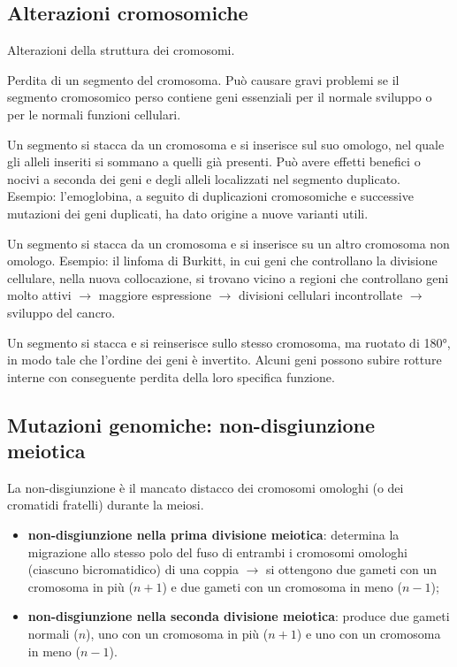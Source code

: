 \subsection{Alterazioni cromosomiche}

Alterazioni della struttura dei cromosomi.

Perdita di un segmento del cromosoma. Può causare gravi problemi se il segmento cromosomico perso contiene geni essenziali per il normale sviluppo o per le normali funzioni cellulari.

Un segmento si stacca da un cromosoma e si inserisce sul suo omologo, nel quale gli alleli inseriti si sommano a quelli già presenti. Può avere effetti benefici o nocivi a seconda dei geni e degli alleli localizzati nel segmento duplicato. Esempio: l'emoglobina, a seguito di duplicazioni cromosomiche e successive mutazioni dei geni duplicati, ha dato origine a nuove varianti utili.

Un segmento si stacca da un cromosoma e si inserisce su un altro cromosoma non omologo. Esempio: il linfoma di Burkitt, in cui geni che controllano la divisione cellulare, nella nuova collocazione, si trovano vicino a regioni che controllano geni molto attivi $\rightarrow$ maggiore espressione $\rightarrow$ divisioni cellulari incontrollate $\rightarrow$ sviluppo del cancro.

Un segmento si stacca e si reinserisce sullo stesso cromosoma, ma ruotato di 180°, in modo tale che l'ordine dei geni è invertito. Alcuni geni possono subire rotture interne con conseguente perdita della loro specifica funzione.

\subsection{Mutazioni genomiche: non-disgiunzione meiotica}

La non-disgiunzione è il mancato distacco dei cromosomi omologhi (o dei cromatidi fratelli) durante la meiosi.
\begin{itemize}
  \item \textbf{non-disgiunzione nella prima divisione meiotica}: determina la migrazione allo stesso polo del fuso di entrambi i cromosomi omologhi (ciascuno bicromatidico) di una coppia $\rightarrow$ si ottengono due gameti con un cromosoma in più ($n+1$) e due gameti con un cromosoma in meno ($n-1$);
  \item \textbf{non-disgiunzione nella seconda divisione meiotica}: produce due gameti normali ($n$), uno con un cromosoma in più ($n+1$) e uno con un cromosoma in meno ($n-1$).
\end{itemize}

